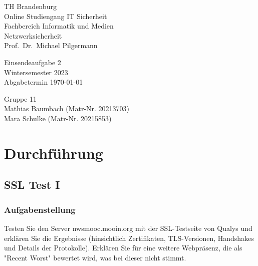 \documentclass{article}
\begin{document}
\begin{titlepage}
	\begin{flushleft}
		TH Brandenburg \\
		Online Studiengang IT Sicherheit \\
		Fachbereich Informatik und Medien \\
		Netzwerksicherheit \\
		Prof.\ Dr.\ Michael Pilgermann
	\end{flushleft}

	\vfill

	\begin{center}
		\Large{Einsendeaufgabe 2}\\[0.5em]
		\large{Wintersemester 2023}\\[0.25em]
		\large{Abgabetermin \today}
	\end{center}

	\vfill

	\begin{flushright}
		Gruppe 11 \\
		Mathias Baumbach (Matr-Nr. 20213703) \\
		Mara Schulke (Matr-Nr. 20215853)
	\end{flushright}
\end{titlepage}

\begin{abstract}
\end{abstract}

\tableofcontents

\listoffigures

\newpage

\section{Durchführung}

\subsection{SSL Test I}

\subsubsection*{Aufgabenstellung}

Testen Sie den Server nwsmooc.mooin.org mit der SSL-Testseite von Qualys 
und erklären Sie die Ergebnisse (hinsichtlich Zertifikaten, TLS-Versionen,
Handshakes und Details der Protokolle). Erklären Sie für eine weitere
Webpräsenz, die als "Recent Worst" bewertet wird, was bei dieser nicht stimmt. 
\end{document}

